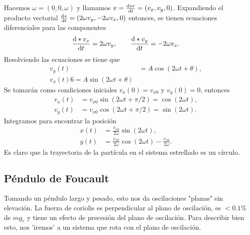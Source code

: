 Hacemos $\omega = (0,0,\omega)$ y llamamos $v = \dv{*r}{t} = (v_x, v_y, 0)$. Expandiendo el producto vectorial $ \dv{*}{t} (v_x,v_y,0) = (2\omega v_y,-2\omega v_x,0)$ entonces, se tienen ecuaciones diferenciales para las componentes
	\begin{equation}
		\dv{*v_x}{t} = 2\omega v_y, \qquad \dv{*v_y}{t} = -2\omega v_x.
	\end{equation}
Resolviendo las ecuaciones se tiene que 
	\begin{align*}
		v_y (t) &= A \cos{(2\omega t + \theta)} ,\\
		v_x (t) 6= A\sin{(2\omega t + \theta)}
	\end{align*}
Se tomarán como condiciones iniciales $v_x (0) = v_{x0}$ y $v_y (0) = 0$, entonces
	\begin{align}
		v_x (t) &= v_{x0} \sin{(2\omega t + \pi/2)} = \cos{(2\omega t)}, \\
		v_y (t) &= v_{x0} \cos{(2\omega t + \pi/2)} = \sin{(2\omega t)}.
	\end{align}
Integramos para encontrar la posición
	\begin{align}
		x(t) &= \frac{v_{x0}}{2\omega} \sin{(2\omega t)}, \\
		y(t) &= \frac{v_{x0}}{2\omega} \cos{(2\omega t)} - \frac{v_{x0}}{2\omega}.
	\end{align}
Es claro que la trayectoria de la partícula en el sistema estrellado es un círculo.

\subsection{Péndulo de Foucault}
Tomando un péndulo largo y pesado, esto nos da oscilaciones "planas" sin elevación. La fuerza de coriolis es perpendicular al plano de oscilación, es $<0.1\%$ de $mg_e$ y tiene un efecto de precesión del plano de oscilación. Para describir bien esto, nos 'iremos' a un sistema que rota con el plano de oscilación. \\

